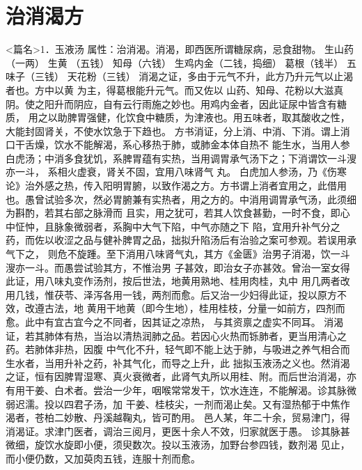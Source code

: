\documentclass[a4paper,12pt,UTF8,twoside]{ctexbook}
\begin{document}
\chapter{治消渴方}
<篇名>1．玉液汤
属性：治消渴。消渴，即西医所谓糖尿病，忌食甜物。 
生山药（一两） 生黄 （五钱） 知母（六钱） 生鸡内金（二钱，捣细） 葛根（钱半） 五味子（三钱） 
天花粉（三钱） 
消渴之证，多由于元气不升，此方乃升元气以止渴者也。方中以黄 为主，得葛根能升元气。而又佐以 
山药、知母、花粉以大滋真阴。使之阳升而阴应，自有云行雨施之妙也。用鸡内金者，因此证尿中皆含有糖质， 
用之以助脾胃强健，化饮食中糖质，为津液也。用五味者，取其酸收之性，大能封固肾关，不使水饮急于下趋也。 
方书消证，分上消、中消、下消。谓上消口干舌燥，饮水不能解渴，系心移热于肺，或肺金本体自热不 
能生水，当用人参白虎汤；中消多食犹饥，系脾胃蕴有实热，当用调胃承气汤下之；下消谓饮一斗溲亦一斗， 
系相火虚衰，肾关不固，宜用八味肾气 
丸。 
白虎加人参汤，乃《伤寒论》治外感之热，传入阳明胃腑，以致作渴之方。方书谓上消者宜用之，此借用 
也。愚曾试验多次，然必胃腑兼有实热者，用之方的。中消用调胃承气汤，此须细为斟酌，若其右部之脉滑而 
且实，用之犹可，若其人饮食甚勤，一时不食，即心中怔忡，且脉象微弱者，系胸中大气下陷，中气亦随之下 
陷，宜用升补气分之药，而佐以收涩之品与健补脾胃之品，拙拟升陷汤后有治验之案可参观。若误用承气下之， 
则危不旋踵。至下消用八味肾气丸，其方《金匮》治男子消渴，饮一斗溲亦一斗。而愚尝试验其方，不惟治男 
子甚效，即治女子亦甚效。曾治一室女得此证，用八味丸变作汤剂，按后世法，地黄用熟地、桂用肉桂，丸中 
用几两者改用几钱，惟茯苓、泽泻各用一钱，两剂而愈。后又治一少妇得此证，投以原方不效，改遵古法，地 
黄用干地黄（即今生地），桂用桂枝，分量一如前方，四剂而愈。此中有宜古宜今之不同者，因其证之凉热， 
与其资禀之虚实不同耳。 
消渴证，若其肺体有热，当治以清热润肺之品。若因心火热而铄肺者，更当用清心之药。若肺体非热，因腹 
中气化不升，轻气即不能上达于肺，与吸进之养气相合而生水者，当用升补之药，补其气化，而导之上升，此 
拙拟玉液汤之义也。然消渴之证，恒有因脾胃湿寒、真火衰微者，此肾气丸所以用桂、附。而后世治消渴，亦 
有用干姜、白术者。尝治一少年，咽喉常常发干，饮水连连，不能解渴。诊其脉微弱迟濡。投以四君子汤，加 
干姜、桂枝尖，一剂而渴止矣。又有湿热郁于中焦作渴者，苍柏二妙散、丹溪越鞠丸，皆可酌用。 
邑人某，年二十余，贸易津门，得消渴证。求津门医者，调治三阅月，更医十余人不效，归家就医于愚。 
诊其脉甚微细，旋饮水旋即小便，须臾数次。投以玉液汤，加野台参四钱，数剂渴 
见止，而小便仍数，又加萸肉五钱，连服十剂而愈。 
\end{document}
